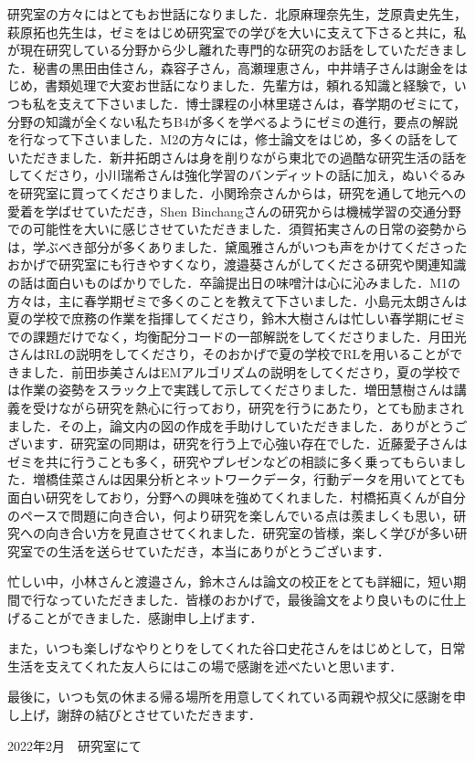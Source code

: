 研究室の方々にはとてもお世話になりました．北原麻理奈先生，芝原貴史先生，萩原拓也先生は，ゼミをはじめ研究室での学びを大いに支えて下さると共に，私が現在研究している分野から少し離れた専門的な研究のお話をしていただきました．秘書の黒田由佳さん，森容子さん，高瀬理恵さん，中井靖子さんは謝金をはじめ，書類処理で大変お世話になりました．先輩方は，頼れる知識と経験で，いつも私を支えて下さいました．博士課程の小林里瑳さんは，春学期のゼミにて，分野の知識が全くない私たちB4が多くを学べるようにゼミの進行，要点の解説を行なって下さいました．M2の方々には，修士論文をはじめ，多くの話をしていただきました．新井拓朗さんは身を削りながら東北での過酷な研究生活の話をしてくださり，小川瑞希さんは強化学習のバンディットの話に加え，ぬいぐるみを研究室に買ってくださりました．小関玲奈さんからは，研究を通して地元への愛着を学ばせていただき，Shen Binchangさんの研究からは機械学習の交通分野での可能性を大いに感じさせていただきました．須賀拓実さんの日常の姿勢からは，学ぶべき部分が多くありました．黛風雅さんがいつも声をかけてくださったおかげで研究室にも行きやすくなり，渡邉葵さんがしてくださる研究や関連知識の話は面白いものばかりでした．卒論提出日の味噌汁は心に沁みました．M1の方々は，主に春学期ゼミで多くのことを教えて下さいました．小島元太朗さんは夏の学校で庶務の作業を指揮してくださり，鈴木大樹さんは忙しい春学期にゼミでの課題だけでなく，均衡配分コードの一部解説をしてくださりました．月田光さんはRLの説明をしてくださり，そのおかげで夏の学校でRLを用いることができました．前田歩美さんはEMアルゴリズムの説明をしてくださり，夏の学校では作業の姿勢をスラック上で実践して示してくださりました．増田慧樹さんは講義を受けながら研究を熱心に行っており，研究を行うにあたり，とても励まされました．その上，論文内の図の作成を手助けしていただきました．ありがとうございます．研究室の同期は，研究を行う上で心強い存在でした．近藤愛子さんはゼミを共に行うことも多く，研究やプレゼンなどの相談に多く乗ってもらいました．増橋佳菜さんは因果分析とネットワークデータ，行動データを用いてとても面白い研究をしており，分野への興味を強めてくれました．村橋拓真くんが自分のペースで問題に向き合い，何より研究を楽しんでいる点は羨ましくも思い，研究への向き合い方を見直させてくれました．研究室の皆様，楽しく学びが多い研究室での生活を送らせていただき，本当にありがとうございます．

忙しい中，小林さんと渡邉さん，鈴木さんは論文の校正をとても詳細に，短い期間で行なっていただきました．皆様のおかげで，最後論文をより良いものに仕上げることができました．感謝申し上げます．

また，いつも楽しげなやりとりをしてくれた谷口史花さんをはじめとして，日常生活を支えてくれた友人らにはこの場で感謝を述べたいと思います．

最後に，いつも気の休まる帰る場所を用意してくれている両親や叔父に感謝を申し上げ，謝辞の結びとさせていただきます．

{\medskip}
\hfill 2022年2月　研究室にて
